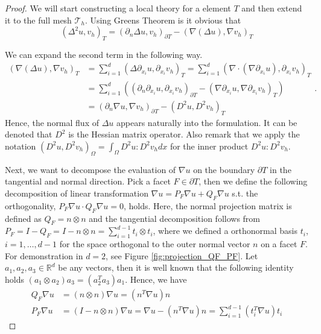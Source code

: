 \documentclass[11pt]{article}
\theoremstyle{remark}
\numberwithin{equation}{section}
\begin{document}
\begin{proof}

 We will start constructing a local theory for a element $T$ and then extend it to the full mesh
$\mathcal{T}_{h} $. Using Greens Theorem is it obvious that
\begin{equation}
    \label{eq:id1}
\left( \Delta ^2 u,v_h \right) _{T }   = \left( \partial _{n} \Delta u, v_h \right) _{\partial T  } - \left( \nabla \left( \Delta  u \right) , \nabla v_h \right) _{T }
\end{equation}

We can expand the second term in the following way.
\begin{equation}
    \label{eq:id2}
    \begin{split}
( \nabla ( \Delta u ) , \nabla v_h ) _{T } & = \sum_{i = 1}^{ d}  ( \Delta  \partial _{x_{i}} u, \partial _{x_{i}}v_h ) _{T }
                                           = \sum_{i = 1}^{d}  ( \nabla \cdot ( \nabla \partial _{x_{i}} u ) , \partial _{x_{i}} v_h )_{T }  \\
&= \sum_{i = 1}^{d}  \left( ( \partial_n  \partial _{x_{i}} u,  \partial _{x_{i}} v_h ) _{\partial T } -   ( \nabla \partial _{x_{i}} u, \nabla \partial _{x_{i}} v_h )_{T } \right) \\
& = (  \partial_n\nabla u, \nabla v_h ) _{\partial_{} T  } - ( D^2 u, D^2v_h ) _{T }
    \end{split}
.\end{equation}
Hence, the normal flux of $\Delta u$ appears naturally into the formulation. It can be denoted that $D^2$ is the Hessian matrix operator. Also remark that we apply the notation
$( D^2u, D^2v_h )_{\Omega } = \int_{\Omega }^{} D^{2}u : D^2v_h  dx$ for the inner product $D^2u:D^2v_h$.

Next, we want to decompose the evaluation of $\nabla  u $ on the boundary $\partial T$ in the tangential and normal direction. Pick a facet  $F \in \partial T$, then we define the following decomposition of linear transformation $\nabla u = P_{F}\nabla u  + Q_{F}  \nabla u  $ s.t. the
orthogonality, $
P_{F} \nabla u  \cdot Q_{F}  \nabla u = 0$, holds. Here, the normal projection matrix is defined as $Q_{F} = n \otimes n $ and the tangential decomposition follows from $ P_{F} = I - Q_{F} = I - n \otimes n  =  \sum_{i=1}^{d-1} t_{i} \otimes t_i$,
where we defined a orthonormal basis $t_{i}$, $i = 1, \ldots, d-1$ for the space orthogonal to the outer normal vector $n$ on a facet $F$. For demonstration in $d=2$, see Figure \ref{fig:projection_QF_PF}. Let $ a_{1}, a_{2}, a_{3} \in \mathbb{R} ^{d}$ be any vectors, then it is well known that the following identity holds $ ( a_{1}
\otimes a_{2}  ) a_{3} = ( a_{2}^{T}  a_{3}) a_{1} $. Hence, we have
\begin{equation}
\label{eq:projection}
    \begin{split}
   Q_{F} \nabla u & = ( n \otimes n ) \nabla u =  (n^{T} \nabla u)n \\
   P_{F} \nabla u & =( I - n \otimes n ) \nabla u =   \nabla u  - (n^{T}  \nabla u)n =  \sum_{ i =1 }^{d-1} ( t_{i}^{T}  \nabla u ) t_{i}
    \end{split}
\end{equation}


\end{proof}
\end{document}
